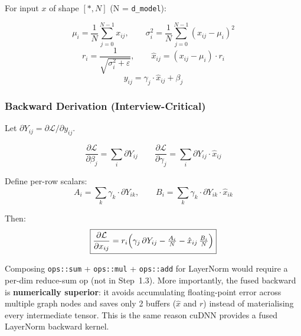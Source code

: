 \documentclass[12pt, a4paper]{article}
\begin{document}
For input \(x\) of shape \([*, N]\) (N = \texttt{d\_model}):

\[
  \mu_i = \frac{1}{N}\sum_{j=0}^{N-1} x_{ij}, \qquad
  \sigma_i^2 = \frac{1}{N}\sum_{j=0}^{N-1}(x_{ij}-\mu_i)^2
\]
\[
  r_i = \frac{1}{\sqrt{\sigma_i^2 + \varepsilon}}, \qquad
  \hat{x}_{ij} = (x_{ij} - \mu_i)\cdot r_i
\]
\[
  y_{ij} = \gamma_j \cdot \hat{x}_{ij} + \beta_j
\]

\subsubsection{Backward Derivation (Interview-Critical)}

Let \(\partial Y_{ij} = \partial\mathcal{L}/\partial y_{ij}\).

\[
  \frac{\partial\mathcal{L}}{\partial\beta_j} = \sum_i \partial Y_{ij}
  \qquad
  \frac{\partial\mathcal{L}}{\partial\gamma_j} = \sum_i \partial Y_{ij}\cdot\hat{x}_{ij}
\]

Define per-row scalars:
\[
  A_i = \sum_{k} \gamma_k \cdot \partial Y_{ik}, \qquad
  B_i = \sum_{k} \gamma_k \cdot \partial Y_{ik} \cdot \hat{x}_{ik}
\]

Then:
\[
  \boxed{
    \frac{\partial\mathcal{L}}{\partial x_{ij}}
    = r_i \Bigl(\gamma_j\,\partial Y_{ij} - \tfrac{A_i}{N} - \hat{x}_{ij}\,\tfrac{B_i}{N}\Bigr)
  }
\]

\begin{tcolorbox}[interviewbox, title={Interview: Why a fused op and not composed primitives?}]
  Composing \texttt{ops::sum} + \texttt{ops::mul} + \texttt{ops::add} for
  LayerNorm would require a per-dim reduce-sum op (not in Step~1.3).
  More importantly, the fused backward is \textbf{numerically superior}: it
  avoids accumulating floating-point error across multiple graph nodes and
  saves only 2 buffers (\(\hat{x}\) and \(r\)) instead of materialising
  every intermediate tensor.  This is the same reason cuDNN provides a fused
  LayerNorm backward kernel.
\end{tcolorbox}
\end{document}
